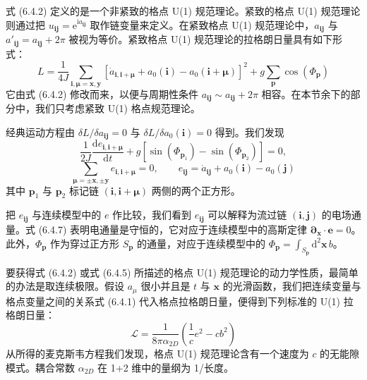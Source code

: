 式 (6.4.2) 定义的是一个非紧致的格点 U(1) 规范理论。紧致的格点 U(1) 规范理论则通过把 $u_{\pmb{i}\pmb{j}}=\mathrm{e}^{\mathrm{i}a_{\pmb{i}\pmb{j}}}$ 取作链变量来定义。在紧致格点 U(1) 规范理论中，$a_{\pmb{i}\pmb{j}}$ 与 $a'_{\pmb{i}\pmb{j}}=a_{\pmb{i}\pmb{j}}+2\pi$ 被视为等价。紧致格点 U(1) 规范理论的拉格朗日量具有如下形式：
\begin{equation*}
L=\frac{1}{4J}\sum_{\pmb{i},\pmb{\mu}=\pmb{x},\pmb{y}}\left[\dot{a}_{\pmb{i},\pmb{i}+\pmb{\mu}}+a_{0}(\pmb{i})-a_{0}(\pmb{i}+\pmb{\mu})\right]^{2}+g\sum_{\pmb{p}}\cos(\Phi_{\pmb{p}}) \tag{6.4.5}
\end{equation*}
它由式 (6.4.2) 修改而来，以便与周期性条件 $a_{\pmb{i}\pmb{j}}\sim a_{\pmb{i}\pmb{j}}+2\pi$ 相容。在本节余下的部分中，我们只考虑紧致 U(1) 格点规范理论。

经典运动方程由 $\delta L/\delta a_{\pmb{i}\pmb{j}}=0$ 与 $\delta L/\delta a_{0}(\pmb{i})=0$ 得到。我们发现
\begin{equation*}
\frac{1}{2J}\frac{\mathrm{d}e_{\pmb{i},\pmb{i}+\pmb{\mu}}}{\mathrm{d}t}+g\left[\sin(\Phi_{\pmb{p}_{1}})-\sin(\Phi_{\pmb{p}_{2}})\right]=0, \tag{6.4.6}
\end{equation*}
\begin{equation*}
\sum_{\pmb{\mu}=\pm\pmb{x},\pm\pmb{y}}e_{\pmb{i},\pmb{i}+\pmb{\mu}}=0, \qquad e_{\pmb{i}\pmb{j}}=\dot{a}_{\pmb{i}\pmb{j}}+a_{0}(\pmb{i})-a_{0}(\pmb{j}) \tag{6.4.7}
\end{equation*}
其中 $\pmb{p}_{1}$ 与 $\pmb{p}_{2}$ 标记链 $(\pmb{i},\pmb{i}+\pmb{\mu})$ 两侧的两个正方形。

把 $e_{\pmb{i}\pmb{j}}$ 与连续模型中的 $e$ 作比较，我们看到 $e_{\pmb{i}\pmb{j}}$ 可以解释为流过链 $(\pmb{i},\pmb{j})$ 的电场通量。式 (6.4.7) 表明电通量是守恒的，它对应于连续模型中的高斯定律 $\pmb{\partial}_{\pmb{x}}\cdot\pmb{e}=0$。此外，$\Phi_{\pmb{p}}$ 作为穿过正方形 $S_{\pmb{p}}$ 的通量，对应于连续模型中的 $\Phi_{\pmb{p}}=\int_{S_{\pmb{p}}}\mathrm{d}^{2}\pmb{x}\,b$。

要获得式 (6.4.2) 或式 (6.4.5) 所描述的格点 U(1) 规范理论的动力学性质，最简单的办法是取连续极限。假设 $a_{\mu}$ 很小并且是 $t$ 与 $\pmb{x}$ 的光滑函数，我们把连续变量与格点变量之间的关系式 (6.4.1) 代入格点拉格朗日量，便得到下列标准的 U(1) 拉格朗日量：
\begin{equation*}
\mathcal{L}=\frac{1}{8\pi\alpha_{2D}}\left(\frac{1}{c}e^{2}-cb^{2}\right) \tag{6.4.8}
\end{equation*}
从所得的麦克斯韦方程我们发现，格点 U(1) 规范理论含有一个速度为 $c$ 的无能隙模式。耦合常数 $\alpha_{2D}$ 在 1+2 维中的量纲为 1/长度。

